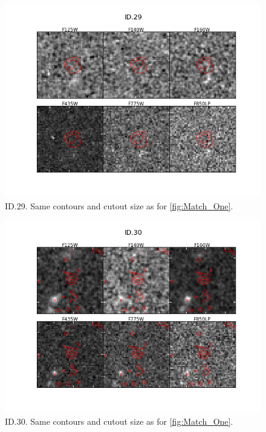 \begin{figure}[tbp]
\centering \includegraphics[width=160mm]{Matched/ASPECS_Cutout_28.png}
\caption{ID.29. Same contours and cutout size as for \ref{fig:Match_One}.}
\label{fig:Match_Three}
\end{figure}

\begin{figure}[tbp]
\centering \includegraphics[width=160mm]{Matched/ASPECS_Cutout_29.png}
\caption{ID.30. Same contours and cutout size as for \ref{fig:Match_One}.}
\label{fig:Match_Three}
\end{figure}


